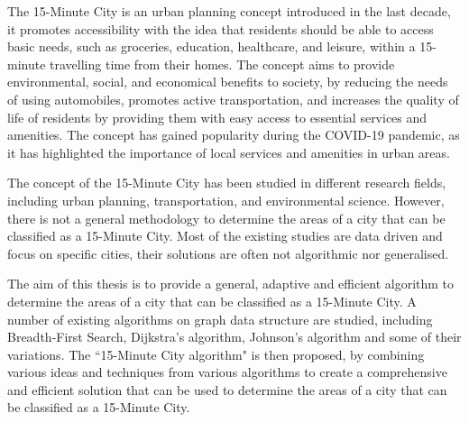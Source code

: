\begin{Abstract}
\begin{changemargin}{1cm}{1cm}

The 15-Minute City is an urban planning concept introduced in the last decade, it promotes accessibility with the idea that residents should be able to access basic needs, such as groceries, education, healthcare, and leisure, within a 15-minute travelling time from their homes. The concept aims to provide environmental, social, and economical benefits to society, by reducing the needs of using automobiles, promotes active transportation, and increases the quality of life of residents by providing them with easy access to essential services and amenities. The concept has gained popularity during the COVID-19 pandemic, as it has highlighted the importance of local services and amenities in urban areas.

\vspace{0.5cm}

The concept of the 15-Minute City has been studied in different research fields, including urban planning, transportation, and environmental science. However, there is not a general methodology to determine the areas of a city that can be classified as a 15-Minute City. Most of the existing studies are data driven and focus on specific cities, their solutions are often not algorithmic nor generalised.

\vspace{0.5cm}

The aim of this thesis is to provide a general, adaptive and efficient algorithm to determine the areas of a city that can be classified as a 15-Minute City. A number of existing algorithms on graph data structure are studied, including Breadth-First Search, Dijkstra's algorithm, Johnson's algorithm and some of their variations. The ``15-Minute City algorithm" is then proposed, by combining various ideas and techniques from various algorithms to create a comprehensive and efficient solution that can be used to determine the areas of a city that can be classified as a 15-Minute City.

\end{changemargin}
\end{Abstract}